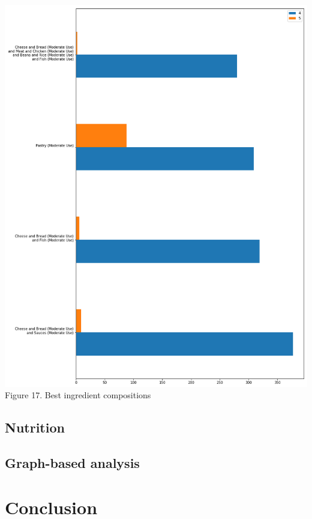 \documentclass[11pt]{article}
\begin{document}
\vspace{5mm}
\begin{center}
\includegraphics[scale=0.18]{ingredient-rating} \\
\label{ingredient-rating} Figure 17. Best ingredient compositions
\end{center}
\vspace{5mm}

\subsection{Nutrition}


\subsection{Graph-based analysis}


\section{Conclusion}
\end{document}
